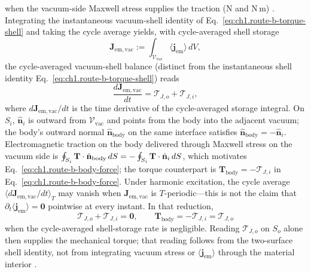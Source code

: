 when the vacuum-side Maxwell stress supplies the traction (N and N\,m) \cite{stratton1941,harrington2001}. Integrating the instantaneous vacuum-shell identity of Eq.~\eqref{eq:ch1.route-b-torque-shell} and taking the cycle average yields, with cycle-averaged shell storage
\begin{equation}
\label{eq:ch1.J-em-vac-def}
\mathbf{J}_{\mathrm{em,vac}}:=\int_{\mathcal{V}_{\mathrm{vac}}}\langle\mathbf{j}_{\mathrm{em}}\rangle\,dV,
\end{equation}
the cycle-averaged vacuum-shell balance (distinct from the instantaneous shell identity Eq.~\eqref{eq:ch1.route-b-torque-shell}) reads
\begin{equation}
\label{eq:ch1.route-b-torque-shell-averaged}
\frac{d\mathbf{J}_{\mathrm{em,vac}}}{dt}
=\boldsymbol{\mathcal{T}}_{J,o}+\boldsymbol{\mathcal{T}}_{J,i},
\end{equation}
where $d\mathbf{J}_{\mathrm{em,vac}}/dt$ is the time derivative of the cycle-averaged storage integral. On $S_i$, $\hat{\mathbf{n}}_i$ is outward from $\mathcal{V}_{\mathrm{vac}}$ and points from the body into the adjacent vacuum; the body's outward normal $\hat{\mathbf{n}}_{\mathrm{body}}$ on the same interface satisfies $\hat{\mathbf{n}}_{\mathrm{body}}=-\hat{\mathbf{n}}_i$. Electromagnetic traction on the body delivered through Maxwell stress on the vacuum side is $\oint_{S_i}\mathbf{T}\cdot\hat{\mathbf{n}}_{\mathrm{body}}\,dS=-\oint_{S_i}\mathbf{T}\cdot\hat{\mathbf{n}}_i\,dS$, which motivates Eq.~\eqref{eq:ch1.route-b-body-force}; the torque counterpart is $\mathbf{T}_{\mathrm{body}}=-\boldsymbol{\mathcal{T}}_{J,i}$ in Eq.~\eqref{eq:ch1.route-b-body-force}. Under harmonic excitation, the cycle average $\langle d\mathbf{J}_{\mathrm{em,vac}}/dt\rangle_T$ may vanish when $\mathbf{J}_{\mathrm{em,vac}}$ is $T$-periodic---this is not the claim that $\partial_t\langle\mathbf{j}_{\mathrm{em}}\rangle=\mathbf{0}$ pointwise at every instant. In that reduction,
\begin{equation}
\label{eq:ch1.route-b-body-torque-steady}
\boldsymbol{\mathcal{T}}_{J,o}+\boldsymbol{\mathcal{T}}_{J,i}=\mathbf{0},\qquad
\mathbf{T}_{\mathrm{body}}=-\boldsymbol{\mathcal{T}}_{J,i}=\boldsymbol{\mathcal{T}}_{J,o}
\end{equation}
when the cycle-averaged shell-storage rate is negligible. Reading $\boldsymbol{\mathcal{T}}_{J,o}$ on $S_o$ alone then supplies the mechanical torque; that reading follows from the two-surface shell identity, not from integrating vacuum stress or $\langle\mathbf{j}_{\mathrm{em}}\rangle$ through the material interior \cite{stratton1941,harrington2001,beth1936}.

